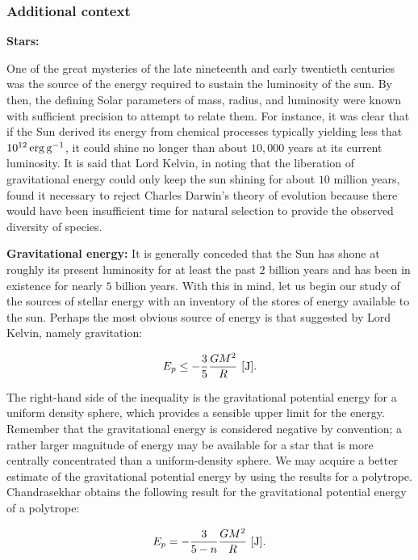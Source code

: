 \documentclass[a4paper,10pt]{article}
\begin{document}
\subsubsection{Additional context}

{\noindent}\textbf{Stars:}

{\noindent}One of the great mysteries of the late nineteenth and early twentieth centuries was the source of the energy required to sustain the luminosity of the sun. By then, the defining Solar parameters of mass, radius, and luminosity were known with sufficient precision to attempt to relate them. For instance, it was clear that if the Sun derived its energy from chemical processes typically yielding less that $10^{12}\,{\rm erg\,g^{-1}}$, it could shine no longer than about $10,000$ years at its current luminosity. It is said that Lord Kelvin, in noting that the liberation of gravitational energy could only keep the sun shining for about $10$ million years, found it necessary to reject Charles Darwin's theory of evolution because there would have been insufficient time for natural selection to provide the observed diversity of species.

{\noindent}\textbf{Gravitational energy:} It is generally conceded that the Sun has shone at roughly its present luminosity for at least the past $2$ billion years and has been in existence for nearly $5$ billion years. With this in mind, let us begin our study of the sources of stellar energy with an inventory of the stores of energy available to the sun. Perhaps the most obvious source of energy is that suggested by Lord Kelvin, namely gravitation:

\begin{align*}
    E_p \leq -\frac{3}{5}\frac{GM^2}{R} ~ [{\rm J}].
\end{align*}

{\noindent}The right-hand side of the inequality is the gravitational potential energy for a uniform density sphere, which provides a sensible upper limit for the energy. Remember that the gravitational energy is considered negative by convention; a rather larger magnitude of energy may be available for a star that is more centrally concentrated than a uniform-density sphere. We may acquire a better estimate of the gravitational potential energy by using the results for a polytrope. Chandrasekhar obtains the following result for the gravitational potential energy of a polytrope:

\begin{align*}
    E_p = -\frac{3}{5-n}\frac{GM^2}{R} ~ [{\rm J}].
\end{align*}
\end{document}
